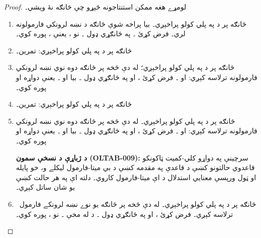 \documentclass[12pt,a4paper,oneside]{report}
\theoremstyle{definition}
\begin{document}
\begin{proof}
\label{olpseg:OLP-0109-B014:start}
لومړے هغه ممکن استنتاجونه څېړو چې څانګه نۀ وېشي۔
\begin{enumerate}
\item څانګه پر  د
  \LR{$\TRule{\True}{\lnot}$} په پلي کولو پراخېږي۔ بيا پراخه شوې څانګه
  د  نښه لرونکي فارمولونه لري۔
  فرض کړئ ۔ په ځانګړي ډول
  ۔ نو
  ، يعنې
  ،
   پوره کوي۔
\item څانګه پر  د
  \LR{$\TRule{\False}{\lnot}$} په پلي کولو پراخېږي: تمرين۔
\item څانګه پر  د
  \LR{$\TRule{\True}{\land}$} په پلي کولو پراخېږي؛ له دې څخه پر څانګه
  دوه نوي نښه لرونکي فارمولونه ترلاسه کېږي:  او
  ۔ فرض کړئ
  ، او په ځانګړي ډول
  ۔ بيا
   او
  ۔ يعنې
   دواړه
   او  پوره کوي۔
\item څانګه پر  د
  \LR{$\TRule{\False}{\lor}$} په پلي کولو پراخېږي: تمرين۔
\item څانګه پر  د
  \LR{$\TRule{\False}{\lif}$} په پلي کولو پراخېږي۔ له دې څخه پر څانګه
  دوه نوي نښه لرونکي فارمولونه ترلاسه کېږي:  او
  ۔ فرض کړئ
  ، او په ځانګړي ډول
  ۔ بيا
   او
  ۔ يعنې
   دواړه
   او  پوره کوي۔
\label{olpseg:OLP-0109-B014:end}

\label{olpseg:OLP-0109-B015:start}
%
\textbf{د ژباړې د نسخې سمون (OLTAB-009):} سرچينې په دواړو
کلي-کميت ټاکونکو قاعدوي حالتونو کښې د قاعدې په مقدمه کښې د بي ميتا-فارمول
ليکلے و، خو پايله او ټول ورپسې معنايي استدلال د اې ميتا-فارمول
کاروي۔ دلته اې په هر حالت کښې يو شان ساتل کېږي۔
\item څانګه پر \LR{$\sFmla{\True}{\lforall[x][!A(x)]} \in \Gamma$} د
  \LR{$\TRule{\True}{\lforall}$} په پلي کولو پراخېږي۔ له دې څخه پر څانګه
  يو نوے نښه لرونکے فارمول~ ترلاسه کېږي۔
  فرض کړئ ، او په ځانګړي ډول
  ۔ د
   له مخې ۔ نو
  ،  پوره کوي۔
\label{olpseg:OLP-0109-B015:end}


\end{enumerate}
\end{proof}
\end{document}
